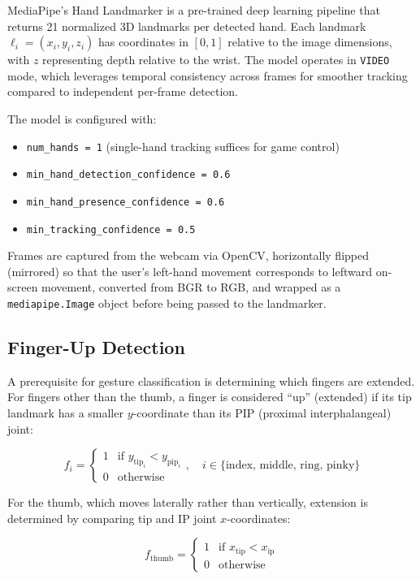 \documentclass[conference]{IEEEtran}
\begin{document}
MediaPipe's Hand Landmarker is a pre-trained deep learning pipeline that returns 21 normalized 3D landmarks per detected hand. Each landmark $\ell_i = (x_i, y_i, z_i)$ has coordinates in $[0, 1]$ relative to the image dimensions, with $z$ representing depth relative to the wrist. The model operates in \texttt{VIDEO} mode, which leverages temporal consistency across frames for smoother tracking compared to independent per-frame detection.

The model is configured with:
\begin{itemize}
    \item \texttt{num\_hands = 1} (single-hand tracking suffices for game control)
    \item \texttt{min\_hand\_detection\_confidence = 0.6}
    \item \texttt{min\_hand\_presence\_confidence = 0.6}
    \item \texttt{min\_tracking\_confidence = 0.5}
\end{itemize}

Frames are captured from the webcam via OpenCV, horizontally flipped (mirrored) so that the user's left-hand movement corresponds to leftward on-screen movement, converted from BGR to RGB, and wrapped as a \texttt{mediapipe.Image} object before being passed to the landmarker.

\subsection{Finger-Up Detection}

A prerequisite for gesture classification is determining which fingers are extended. For fingers other than the thumb, a finger is considered ``up'' (extended) if its tip landmark has a smaller $y$-coordinate than its PIP (proximal interphalangeal) joint:

\begin{equation}
    f_i = \begin{cases} 1 & \text{if } y_{\text{tip}_i} < y_{\text{pip}_i} \\ 0 & \text{otherwise} \end{cases}, \quad i \in \{\text{index, middle, ring, pinky}\}
    \label{eq:fingerup}
\end{equation}

For the thumb, which moves laterally rather than vertically, extension is determined by comparing tip and IP joint $x$-coordinates:

\begin{equation}
    f_{\text{thumb}} = \begin{cases} 1 & \text{if } x_{\text{tip}} < x_{\text{ip}} \\ 0 & \text{otherwise} \end{cases}
    \label{eq:thumbup}
\end{equation}
\end{document}
